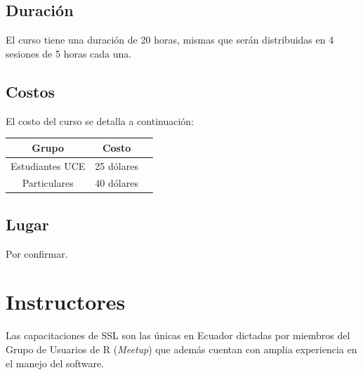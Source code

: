 \documentclass[11pt,a4paper,oneside]{article}\usepackage[]{graphicx}\usepackage[]{color}
\begin{document}
\subsection{Duración}
  
El curso tiene una duración de 20 horas, mismas que serán distribuidas en 4 sesiones de 5 horas cada una.

\subsection{Costos}

El costo del curso se detalla a continuación:

\begin{center}
\begin{tabular}{|c|c|c|}\hline
{\bf Grupo} & {\bf Costo}\\ \hline
Estudiantes UCE & 25 dólares \\ \hline
Particulares & 40 dólares\\ \hline
\end{tabular}
\end{center}

\subsection{Lugar}

Por confirmar.

\section{Instructores}

Las capacitaciones de SSL son las únicas en Ecuador dictadas por miembros del Grupo de Usuarios de R (\emph{Meetup}) que además cuentan con amplia experiencia en el manejo del software.\\
\end{document}
